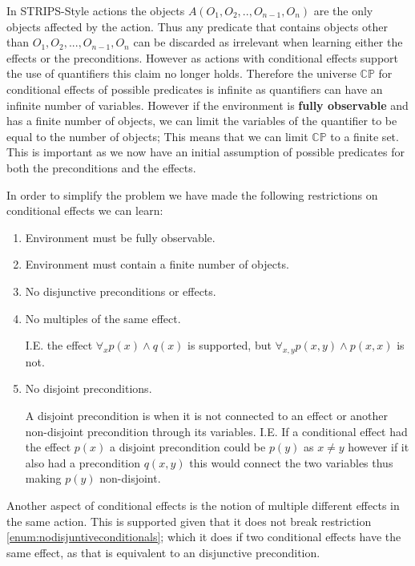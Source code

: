 \documentclass[../Master.tex]{subfiles}
\begin{document}
In STRIPS-Style actions the objects $A(O_1,O_2,..,O_{n-1},O_n)$ are the only objects affected by the action. 
Thus any predicate that contains objects other than $O_1,O_2,...,O_{n-1},O_n$ can be discarded as irrelevant when learning either the effects or the preconditions.
However as actions with conditional effects support the use of quantifiers this claim no longer holds. 
Therefore the universe $\mathbb{CP}$ for conditional effects of possible predicates is infinite as quantifiers can have an infinite number of variables.
However if the environment is \textbf{fully observable} and has a finite number of objects, 
we can limit the variables of the quantifier to be equal to the number of objects; This means that we can limit $\mathbb{CP}$ to a finite set.
This is important as we now have an initial assumption of possible predicates for both the preconditions and the effects. 

In order to simplify the problem we have made the following restrictions on conditional effects we can learn:
\begin{enumerate}
	\item Environment must be fully observable.
	\item Environment must contain a finite number of objects.
	\item \label{enum:nodisjuntiveconditionals} No disjunctive preconditions or effects.
	\item \label{enum:nomultipleeffect} No multiples of the same effect. 
	
		  I.E. the effect $\forall_x p(x) \land q(x)$ is supported, but $\forall_{x, y} p(x, y) \land p(x, x) $ is not.
		  
	\item \label{enum:nodisjointpreconditions} No disjoint preconditions. 
	
		  A disjoint precondition is when it is not connected to an effect or another non-disjoint precondition through its variables.
		  I.E. If a conditional effect had the effect $p(x)$ a disjoint precondition could be $p(y)$ as $x \neq y$ however if it also had a precondition $q(x,y)$ this would connect the two variables thus making $p(y)$ non-disjoint.
\end{enumerate}

Another aspect of conditional effects is the notion of multiple different effects in the same action. This is supported given that it does not break restriction \ref{enum:nodisjuntiveconditionals}; which it does if two conditional effects have the same effect, as that is equivalent to an disjunctive precondition.
 
\end{document}
